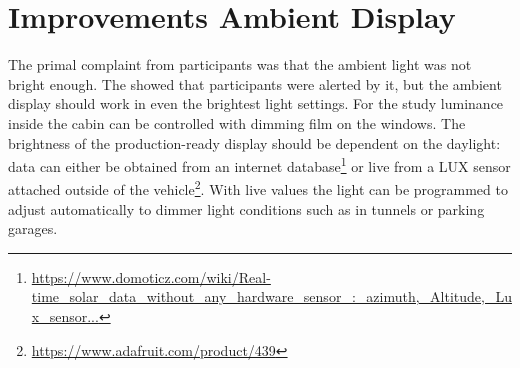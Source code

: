 \section{Improvements Ambient Display}
\label{ImrpoveDisplay}
The primal complaint from participants was that the ambient light was not bright enough. The \emph{} showed that participants were alerted by it, but the ambient display should work in even the brightest light settings. For the study luminance inside the cabin can be controlled with dimming film on the windows. The brightness of the production-ready display should be dependent on the daylight: data can either be obtained from an internet database\footnote{\url{https://www.domoticz.com/wiki/Real-time_solar_data_without_any_hardware_sensor_:_azimuth,_Altitude,_Lux_sensor...}} or live from a LUX sensor attached outside of the vehicle\footnote{\url{https://www.adafruit.com/product/439}}. With live values the light can be programmed to adjust automatically to dimmer light conditions such as in tunnels or parking garages.

